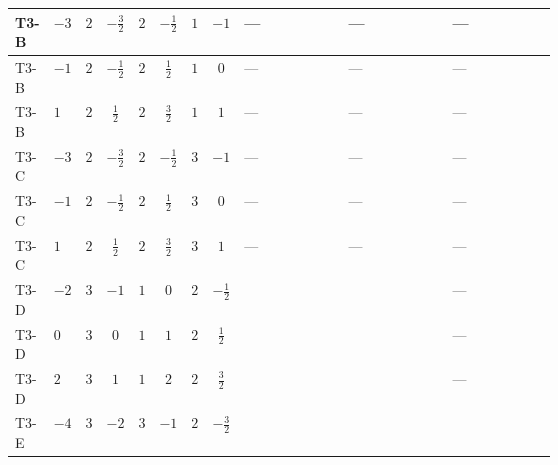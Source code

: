 \documentclass[8pt]{article}
\begin{document}
\begin{landscape}
\begin{longtable}{@{}llcccccc >{\raggedright\arraybackslash}p{0.21\linewidth} >{\raggedright\arraybackslash}p{0.21\linewidth} >{\raggedright\arraybackslash}p{0.21\linewidth}@{}}
\midrule
T3-B & $-3$ & $2$ & $-\frac{3}{2}$ & $2$ & $-\frac{1}{2}$ & $1$ & $-1$ & --- & --- & --- \\
\midrule
T3-B & $-1$ & $2$ & $-\frac{1}{2}$ & $2$ & $\frac{1}{2}$ & $1$ & $0$ & --- & --- & --- \\
\midrule
T3-B & $1$ & $2$ & $\frac{1}{2}$ & $2$ & $\frac{3}{2}$ & $1$ & $1$ & --- & --- & --- \\
\midrule
T3-C & $-3$ & $2$ & $-\frac{3}{2}$ & $2$ & $-\frac{1}{2}$ & $3$ & $-1$ & --- & --- & --- \\
\midrule
T3-C & $-1$ & $2$ & $-\frac{1}{2}$ & $2$ & $\frac{1}{2}$ & $3$ & $0$ & --- & --- & --- \\
\midrule
T3-C & $1$ & $2$ & $\frac{1}{2}$ & $2$ & $\frac{3}{2}$ & $3$ & $1$ & --- & --- & --- \\
\midrule
T3-D & $-2$ & $3$ & $-1$ & $1$ & $0$ & $2$ & $-\frac{1}{2}$ & \scriptsize\adjustbox{max width=\linewidth}{$\begin{gathered} +6 {g_2}^4\end{gathered}$} & \scriptsize\adjustbox{max width=\linewidth}{$\begin{gathered} +6 {\lambda_{HS_1}^{(A)}}^2\end{gathered}$} & --- \\
\midrule
T3-D & $0$ & $3$ & $0$ & $1$ & $1$ & $2$ & $\frac{1}{2}$ & \scriptsize\adjustbox{max width=\linewidth}{$\begin{gathered} +6 {g_2}^4\end{gathered}$} & \scriptsize\adjustbox{max width=\linewidth}{$\begin{gathered} +6 {\lambda_{HS_1}^{(A)}}^2\end{gathered}$} & --- \\
\midrule
T3-D & $2$ & $3$ & $1$ & $1$ & $2$ & $2$ & $\frac{3}{2}$ & \scriptsize\adjustbox{max width=\linewidth}{$\begin{gathered} +6 {g_2}^4\end{gathered}$} & \scriptsize\adjustbox{max width=\linewidth}{$\begin{gathered} +6 {\lambda_{HS_1}^{(A)}}^2\end{gathered}$} & --- \\
\midrule
T3-E & $-4$ & $3$ & $-2$ & $3$ & $-1$ & $2$ & $-\frac{3}{2}$ & \scriptsize\adjustbox{max width=\linewidth}{$\begin{gathered} +6 {g_2}^4\end{gathered}$} & \scriptsize\adjustbox{max width=\linewidth}{$\begin{gathered} +6 {\lambda_{HS_1}^{(A)}}^2\end{gathered}$} & \scriptsize\adjustbox{max width=\linewidth}{$\begin{gathered} +{\lambda_{HS_2}^{(1)}} (6 {\lambda_{12}^{(1)}}+4 {\lambda_{12}^{(\times)}})\end{gathered}$} \\

\end{longtable}
\end{landscape}
\end{document}
